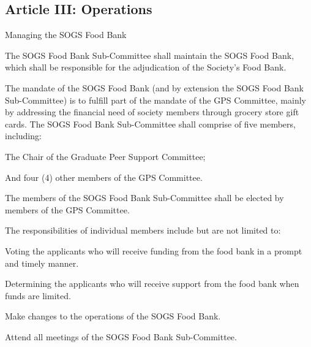 \subsection{Article III: Operations}
\begin{longenum}[ label*=\thesubsection.\arabic*., align=left] 
	\item Managing the SOGS Food Bank
		\begin{longenum}[label*=\arabic*., align=left]	
		\item The SOGS Food Bank Sub-Committee shall maintain the SOGS Food Bank, which shall be responsible for the adjudication of the Society’s Food Bank.
		\item The mandate of the SOGS Food Bank (and by extension the SOGS Food Bank Sub-Committee) is to fulfill part of the mandate of the GPS Committee, mainly by addressing the financial need of society members through grocery store     gift cards.
The SOGS Food Bank Sub-Committee shall comprise of five members, including:
			\begin{longenum}[label*=\arabic*., align=left]
			\item The Chair of the Graduate Peer Support Committee;
			\item And four (4) other members of the GPS Committee.
			\end{longenum}
		\item The members of the SOGS Food Bank Sub-Committee shall be elected by members of the GPS Committee.
		\item The responsibilities of individual members include but are not limited to:
			\begin{longenum}[label*=\arabic*., align=left]
			\item Voting the applicants who will receive funding from the food bank in a prompt and timely manner.
			\item Determining the applicants who will receive support from the food bank when funds are limited.
			\item Make changes to the operations of the SOGS Food Bank.
			\item Attend all meetings of the SOGS Food Bank Sub-Committee.
			\end{longenum}
		\end{longenum}
\end{longenum}